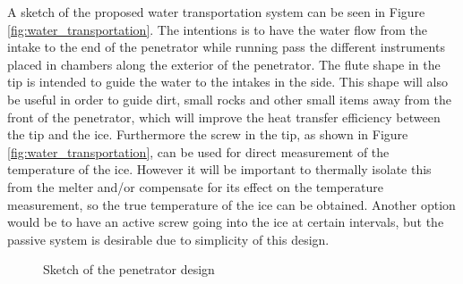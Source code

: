 A sketch of the proposed water transportation system can be seen in Figure \ref{fig:water_transportation}. The intentions is to have the water flow from the intake to the end of the penetrator while running pass the different instruments placed in chambers along the exterior of the penetrator. The flute shape in the tip is intended to guide the water to the intakes in the side. This shape will also be useful in order to guide dirt, small rocks and other small items away from the front of the penetrator, which will improve the heat transfer efficiency between the tip and the ice. Furthermore the screw in the tip, as shown in Figure \ref{fig:water_transportation}, can be used for direct measurement of the temperature of the ice. However it will be important to thermally isolate this from the melter and/or compensate for its effect on the temperature measurement, so the true temperature of the ice can be obtained. Another option would be to have an active screw going into the ice at certain intervals, but the passive system is desirable due to simplicity of this design. %
\begin{figure}[htb]
	\centering
	\captionsetup[subfigure]{width=0.25\textwidth}
	\caption{Sketch of the penetrator design}
\end{figure}
